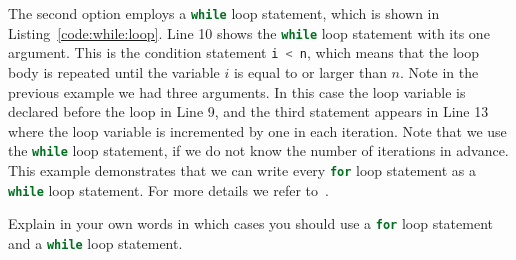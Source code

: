

The second option employs a \lstinline[language=C++]|while| loop statement, which is shown in Listing~\ref{code:while:loop}. Line 10 shows the \lstinline[language=C++]|while| loop statement with its one argument. This is the condition statement  \lstinline[language=C++]{i < n}, which means that the loop body is repeated until the variable $i$ is equal to or larger than $n$. Note in the previous example we had three arguments. In this case the loop variable is declared before the loop in Line 9, and the third statement appears in Line 13 where the loop variable is incremented by one in each iteration. Note that we use the \lstinline[language=C++]|while| loop statement, if we do not know the number of iterations in advance. This example demonstrates that we can write every \lstinline[language=C++]|for| loop statement as a \lstinline[language=C++]|while| loop statement. For more details we refer to~\cite[Chapter~2]{andrew2000accelerated}.   




\begin{exercise}
Explain in your own words in which cases you should use a \lstinline[language=C++]|for| loop statement and a \lstinline[language=C++]|while| loop statement. 
\end{exercise}

